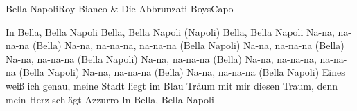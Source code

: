 \begin{song}{Bella Napoli}{Roy Bianco \& Die Abbrunzati Boys}{Capo -}

In Bella, Bella Napoli
Bella, Bella Napoli (Napoli)
Bella, Bella Napoli
Na-na, na-na-na (Bella)
Na-na, na-na-na, na-na-na (Bella Napoli)
Na-na, na-na-na (Bella)
Na-na, na-na-na (Bella Napoli)
Na-na, na-na-na (Bella)
Na-na, na-na-na, na-na-na (Bella Napoli)
Na-na, na-na-na (Bella)
Na-na, na-na-na (Bella Napoli)
Eines weiß ich genau, meine Stadt liegt im Blau
Träum mit mir diesen Traum, denn mein Herz schlägt Azzurro
In Bella, Bella Napoli
\end{song}
